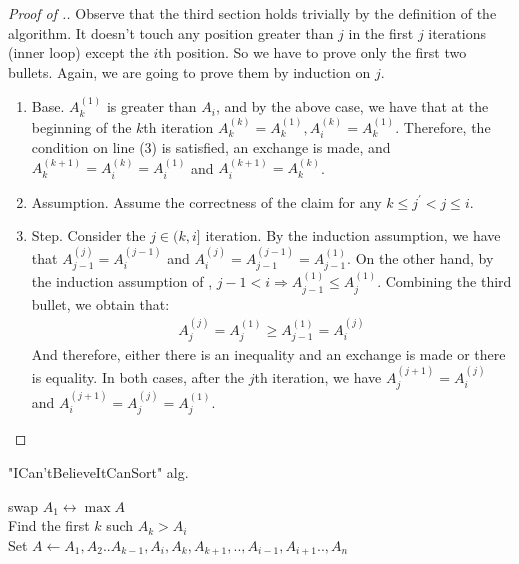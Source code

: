 \documentclass[manuscript,screen,review]{acmart}
\begin{document}
  \begin{proof}[Proof of .]
  Observe that the third section holds trivially by the definition of the algorithm. It doesn't touch any position greater than $j$ in the first $j$ iterations (inner loop) except the $i$th position. So we have to prove only the first two bullets. Again, we are going to prove them by induction on $j$.  
  \begin{enumerate}
    \item Base. $A^{(1)}_{k}$ is greater than $A_{i}$, and by the above case, we have that at the beginning of the $k$th iteration $A^{(k)}_{k}=A^{(1)}_{k}, A^{(k)}_{i}=A^{(1)}_{k}$. Therefore, the condition on line (3) is satisfied, an exchange is made, and $A^{(k+1)}_{k} =A^{(k)}_{i} = A^{(1)}_{i}$ and $A^{(k+1)}_{i} = A^{(k)}_{k}$. %
    \item Assumption. Assume the correctness of the claim for any $k \le j^{\prime} < j \le i$. 
    \item Step. Consider the $j \in (k,i]$ iteration. By the induction assumption, we have that $A^{(j)}_{j-1} = A^{(j-1)}_{i}$ and $A^{(j)}_{i} = A^{(j-1)}_{j-1} = A^{(1)}_{j-1}$. On the other hand, by the induction assumption of , $j-1 < i \Rightarrow A^{(1)}_{j-1} \le A^{(1)}_{j}$. Combining the third bullet, we obtain that:                
      \begin{equation*}
        \begin{split}
          A^{(j)}_{j} = A^{(1)}_{j} \ge A^{(1)}_{j-1} = A^{(j)}_{i}
        \end{split}
      \end{equation*}
      And therefore, either there is an inequality and an exchange is made or there is equality. In both cases, after the $j$th iteration, we have $A^{(j+1)}_{j} = A^{(j)}_{i}$ and $A^{(j+1)}_{i} = A^{(j)}_{j} = A^{(1)}_{j}$.
  \end{enumerate}
\end{proof}


\begin{algorithm}

\SetAlgoLined
{}
\caption{ "ICan'tBelieveItCanSort"  alg.}\label{alg:alg2}
swap $A_{1} \leftrightarrow \max A$ \\
 {
    Find the first $k$ such $A_{k} > A_{i}$ \\
    Set $A \leftarrow A_{1},A_{2}..A_{k-1},A_{i},A_{k},A_{k+1},..,A_{i-1},A_{i+1}..,A_{n}$
}
\end{algorithm}
\end{document}
